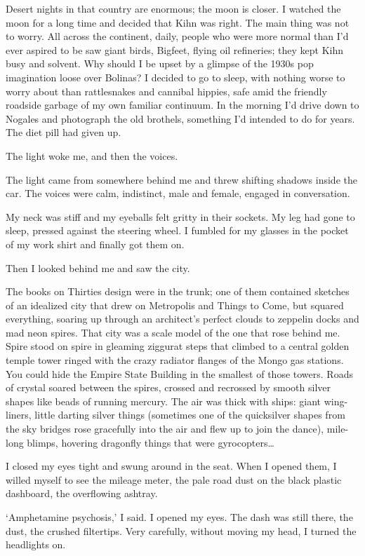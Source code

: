 Desert nights in that country are enormous; the moon is closer. I watched the moon for a long time and decided that Kihn was right. The main thing was not to worry. All across the continent, daily, people who were more normal than I'd ever aspired to be saw giant birds, Bigfeet, flying oil refineries; they kept Kihn busy and solvent. Why should I be upset by a glimpse of the 1930s pop imagination loose over Bolinas? I decided to go to sleep, with nothing worse to worry about than rattlesnakes and cannibal hippies, safe amid the friendly roadside garbage of my own familiar continuum. In the morning I'd drive down to Nogales and photograph the old brothels, something I'd intended to do for years. The diet pill had given up.

The light woke me, and then the voices.

The light came from somewhere behind me and threw shifting shadows inside the car. The voices were calm, indistinct, male and female, engaged in conversation.

My neck was stiff and my eyeballs felt gritty in their sockets. My leg had gone to sleep, pressed against the steering wheel. I fumbled for my glasses in the pocket of my work shirt and finally got them on.

Then I looked behind me and saw the city.

The books on Thirties design were in the trunk; one of them contained sketches of an idealized city that drew on Metropolis and Things to Come, but squared everything, soaring up through an architect's perfect clouds to zeppelin docks and mad neon spires. That city was a scale model of the one that rose behind me. Spire stood on spire in gleaming ziggurat steps that climbed to a central golden temple tower ringed with the crazy radiator flanges of the Mongo gas stations. You could hide the Empire State Building in the smallest of those towers. Roads of crystal soared between the spires, crossed and recrossed by smooth silver shapes like beads of running mercury. The air was thick with ships: giant wing-liners, little darting silver things (sometimes one of the quicksilver shapes from the sky bridges rose gracefully into the air and flew up to join the dance), mile-long blimps, hovering dragonfly things that were gyrocopters…

I closed my eyes tight and swung around in the seat. When I opened them, I willed myself to see the mileage meter, the pale road dust on the black plastic dashboard, the overflowing ashtray.

`Amphetamine psychosis,' I said. I opened my eyes. The dash was still there, the dust, the crushed filtertips. Very carefully, without moving my head, I turned the headlights on.


